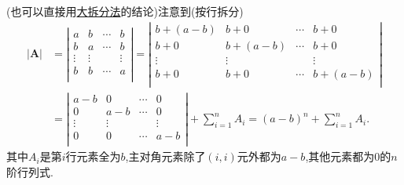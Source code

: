 \documentclass[../../main.tex]{subfiles}%
\begin{document}
\begin{solution}

{\color{blue}}
(也可以直接用\hyperref[大拆分法]{大拆分法}的结论)注意到(按行拆分)
\begin{align*}
|\boldsymbol{A}|&=\left| \begin{matrix}
a&		b&		\cdots&		b\\
b&		a&		\cdots&		b\\
\vdots&		\vdots&		&		\vdots\\
b&		b&		\cdots&		a\\
\end{matrix} \right|=\left| \begin{matrix}
b+\left( a-b \right)&		b+0&		\cdots&		b+0\\
b+0&		b+\left( a-b \right)&		\cdots&		b+0\\
\vdots&		\vdots&		&		\vdots\\
b+0&		b+0&		\cdots&		b+\left( a-b \right)\\
\end{matrix} \right|
\\
&=\left| \begin{matrix}
a-b&		0&		\cdots&		0\\
0&		a-b&		\cdots&		0\\
\vdots&		\vdots&		&		\vdots\\
0&		0&		\cdots&		a-b\\
\end{matrix} \right|+\sum_{i=1}^n{A_i}=\left( a-b \right) ^n+\sum_{i=1}^n{A_i}.
\end{align*}
其中$A_i$是第$i$行元素全为$b$,主对角元素除了$( i,i )$元外都为$a-b$,其他元素都为0的$n$阶行列式.


\end{solution}
\end{document}

